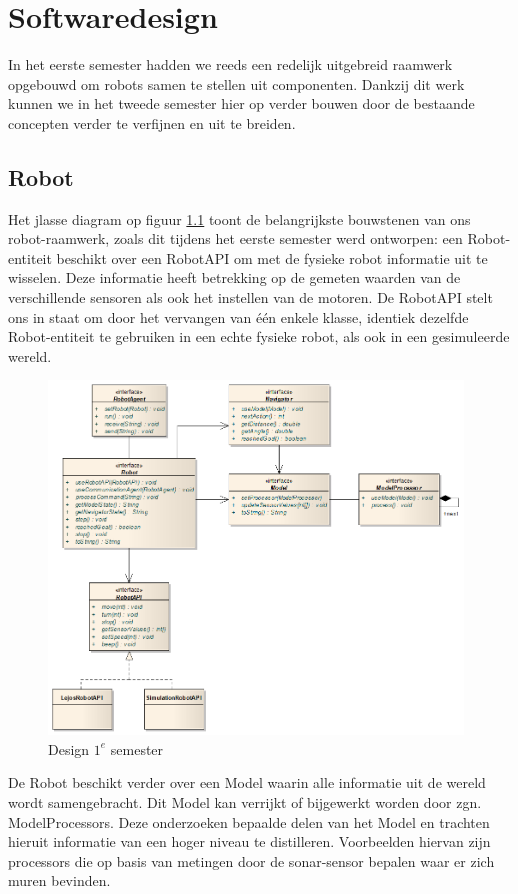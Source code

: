 \documentclass[12pt,a4paper]{report}
\begin{document}
\chapter{Softwaredesign}

In het eerste semester hadden we reeds een redelijk uitgebreid raamwerk opgebouwd om robots samen te stellen uit componenten. Dankzij dit werk kunnen we in het tweede semester hier op verder bouwen door de bestaande concepten verder te verfijnen en uit te breiden.

\section{Robot}

Het jlasse diagram op figuur \ref{uml:design-semester1} toont de belangrijkste bouwstenen van ons robot-raamwerk, zoals dit tijdens het eerste semester werd ontworpen: een Robot-entiteit beschikt over een RobotAPI om met de fysieke robot informatie uit te wisselen. Deze informatie heeft betrekking op de gemeten waarden van de verschillende sensoren als ook het instellen van de motoren. De RobotAPI stelt ons in staat om door het vervangen van \'e\'en enkele klasse, identiek dezelfde Robot-entiteit te gebruiken in een echte fysieke robot, als ook in een gesimuleerde wereld.

\begin{figure}[htbp]
  \centering
  \includegraphics[width=110mm]{resources/design-semester1.png}
  \caption{Design $1^e$ semester}
  \label{uml:design-semester1}
\end{figure}

De Robot beschikt verder over een Model waarin alle informatie uit de wereld wordt samengebracht. Dit Model kan verrijkt of bijgewerkt worden door zgn. ModelProcessors. Deze onderzoeken bepaalde delen van het Model en trachten hieruit informatie van een hoger niveau te distilleren. Voorbeelden hiervan zijn processors die op basis van metingen door de sonar-sensor bepalen waar er zich muren bevinden.
\end{document}
